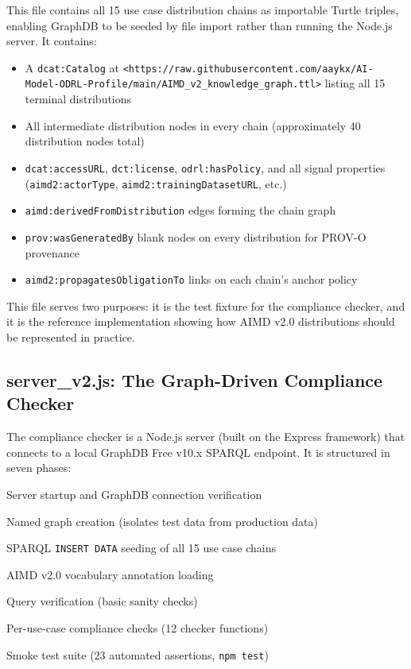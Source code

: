 \documentclass[12pt,a4paper]{article}
\begin{document}
This file contains all 15 use case distribution chains as importable Turtle triples, enabling GraphDB to be seeded by file import rather than running the Node.js server. It contains:

\begin{itemize}[noitemsep]
  \item A \texttt{dcat:Catalog} at \texttt{<https://raw.githubusercontent.com/aaykx/AI-Model-ODRL-Profile/main/AIMD_v2_knowledge_graph.ttl>} listing all 15 terminal distributions
  \item All intermediate distribution nodes in every chain (approximately 40 distribution nodes total)
  \item \texttt{dcat:accessURL}, \texttt{dct:license}, \texttt{odrl:hasPolicy}, and all signal properties (\texttt{aimd2:actorType}, \texttt{aimd2:trainingDatasetURL}, etc.)
  \item \texttt{aimd:derivedFromDistribution} edges forming the chain graph
  \item \texttt{prov:wasGeneratedBy} blank nodes on every distribution for PROV-O provenance
  \item \texttt{aimd2:propagatesObligationTo} links on each chain's anchor policy
\end{itemize}

This file serves two purposes: it is the test fixture for the compliance checker, and it is the reference implementation showing how AIMD v2.0 distributions should be represented in practice.

\subsection{server\_v2.js: The Graph-Driven Compliance Checker}

The compliance checker is a Node.js server (built on the Express framework) that connects to a local GraphDB Free v10.x SPARQL endpoint. It is structured in seven phases:

\begin{description}[leftmargin=3cm, style=nextline]
  \item[Phase 1] Server startup and GraphDB connection verification
  \item[Phase 2] Named graph creation (isolates test data from production data)
  \item[Phase 3] SPARQL \texttt{INSERT DATA} seeding of all 15 use case chains
  \item[Phase 4] AIMD v2.0 vocabulary annotation loading
  \item[Phase 5] Query verification (basic sanity checks)
  \item[Phase 6] Per-use-case compliance checks (12 checker functions)
  \item[Phase 7] Smoke test suite (23 automated assertions, \texttt{npm test})
\end{description}
\end{document}
